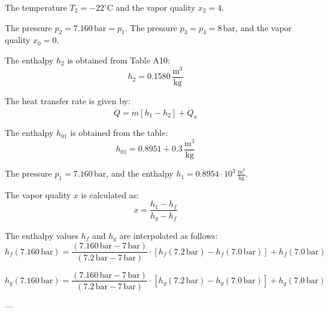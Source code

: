 The temperature \( T_2 = -22^\circ \text{C} \) and the vapor quality \( x_2 = 4 \).  

The pressure \( p_2 = 7.160 \, \text{bar} = p_1 \).  
The pressure \( p_3 = p_4 = 8 \, \text{bar} \), and the vapor quality \( x_0 = 0 \).  

The enthalpy \( h_2 \) is obtained from Table A10:  
\[
h_2 = 0.1580 \, \frac{\text{m}^3}{\text{kg}}
\]  

The heat transfer rate is given by:  
\[
\dot{Q} = \dot{m} \left[ h_1 - h_2 \right] + \dot{Q}_u
\]  

The enthalpy \( h_{01} \) is obtained from the table:  
\[
h_{01} = 0.8951 + 0.3 \, \frac{\text{m}^3}{\text{kg}}
\]  

The pressure \( p_1 = 7.160 \, \text{bar} \), and the enthalpy \( h_1 = 0.8954 \cdot 10^3 \, \frac{\text{m}^3}{\text{kg}} \).  

The vapor quality \( x \) is calculated as:  
\[
x = \frac{h_1 - h_f}{h_g - h_f}
\]  

The enthalpy values \( h_f \) and \( h_g \) are interpolated as follows:  
\[
h_f (7.160 \, \text{bar}) = \frac{(7.160 \, \text{bar} - 7 \, \text{bar})}{(7.2 \, \text{bar} - 7 \, \text{bar})} \cdot \left[ h_f (7.2 \, \text{bar}) - h_f (7.0 \, \text{bar}) \right] + h_f (7.0 \, \text{bar})
\]  

\[
h_g (7.160 \, \text{bar}) = \frac{(7.160 \, \text{bar} - 7 \, \text{bar})}{(7.2 \, \text{bar} - 7 \, \text{bar})} \cdot \left[ h_g (7.2 \, \text{bar}) - h_g (7.0 \, \text{bar}) \right] + h_g (7.0 \, \text{bar})
\]  

---
